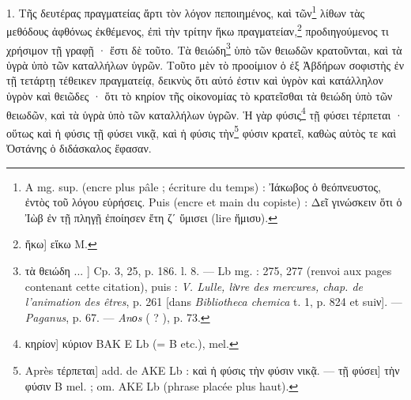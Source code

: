 \documentclass[a4paper, 11pt, oneside, polutonikogreek, french]{article}
\begin{document}
\bigskip

1. Τῆς δευτέρας πραγματείας ἄρτι τὸν λόγον πεποιημένος, καὶ τῶν\footnote{A mg. sup. (encre plus pâle ; écriture du temps) : Ἰάκωβος ὁ θεόπνευστος, ἐντὸς τοῦ λόγου εὑρήσεις. Puis (encre et main du copiste) : Δεῖ γινώσκειν ὅτι ὁ Ἰὼβ ἐν τῇ πληγῇ ἐποίησεν ἔτη ζʹ ὕμισει (lire ἥμισυ).} λίθων τὰς μεθόδους ἀφθόνως ἐκθέμενος, ἐπὶ τὴν τρίτην ἥκω πραγματείαν,\footnote{ἥκω] εἴκω M.} προδιηγούμενος τι χρήσιμον τῇ γραφῇ · ἔστι δὲ τοῦτο. Τὰ θειώδη\footnote{τὰ θειώδη ... ] Cp. 3, 25, p. 186. l. 8. --- Lb mg. : 275, 277 (renvoi aux pages contenant cette citation), puis : \emph{V. Lulle, liνre des mercures, chap. de l'animation des êtres}, p. 261 [dans \emph{Bibliotheca chemica} t. 1, p. 824 et suiν]. --- \emph{Paganus}, p. 67. --- \emph{Anοs} ( ? ), p. 73.} ὑπὸ τῶν θειωδῶν κρατοῦνται, καὶ τὰ ὑγρὰ ὑπὸ τῶν καταλλήλων ὑγρῶν. Τοῦτο μὲν τὸ προοίμιον ὁ ἐξ Ἀβδήρων σοφιστὴς ἐν τῇ τετάρτῃ τέθεικεν πραγματείᾳ, δεικνὺς ὅτι αὐτό ἐστιν καὶ ὑγρὸν καὶ κατάλληλον ὑγρὸν καὶ θειῶδες · ὅτι τὸ κηρίον τῆς οἰκονομίας τὸ κρατεῖσθαι τὰ θειώδη ὑπὸ τῶν θειωδῶν, καὶ τὰ ὑγρὰ ὑπὸ τῶν καταλλήλων ὑγρῶν. Ἡ γὰρ φύσις\footnote{κηρίον] κύριον BAK E Lb (= B etc.), mel.} τῇ φύσει τέρπεται · οὕτως καὶ ἡ φύσις τῇ φύσει νικᾷ, καὶ ἡ φύσις τὴν\footnote{Après τέρπεται] add. de AKE Lb : καὶ ἡ φύσις τὴν φύσιν νικᾷ. --- τῇ φύσει] τὴν φύσιν B mel. ; om. AKE Lb (phrase placée plus haut).} φύσιν κρατεῖ, καθὼς αὐτὸς τε καὶ Ὀστάνης ὁ διδάσκαλος ἔφασαν.
\end{document}
